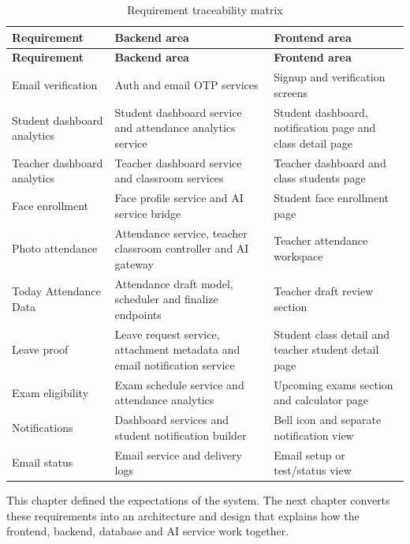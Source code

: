 \begin{longtable}{p{3.4cm} p{4.4cm} p{5.8cm}}
\caption{Requirement traceability matrix}
\label{tab:req-traceability}\\
\toprule
\textbf{Requirement} & \textbf{Backend area} & \textbf{Frontend area}\\
\midrule
\endfirsthead
\toprule
\textbf{Requirement} & \textbf{Backend area} & \textbf{Frontend area}\\
\midrule
\endhead
Email verification & Auth and email OTP services & Signup and verification screens\\
Student dashboard analytics & Student dashboard service and attendance analytics service & Student dashboard, notification page and class detail page\\
Teacher dashboard analytics & Teacher dashboard service and classroom services & Teacher dashboard and class students page\\
Face enrollment & Face profile service and AI service bridge & Student face enrollment page\\
Photo attendance & Attendance service, teacher classroom controller and AI gateway & Teacher attendance workspace\\
Today Attendance Data & Attendance draft model, scheduler and finalize endpoints & Teacher draft review section\\
Leave proof & Leave request service, attachment metadata and email notification service & Student class detail and teacher student detail page\\
Exam eligibility & Exam schedule service and attendance analytics & Upcoming exams section and calculator page\\
Notifications & Dashboard services and student notification builder & Bell icon and separate notification view\\
Email status & Email service and delivery logs & Email setup or test/status view\\
\bottomrule
\end{longtable}

This chapter defined the expectations of the system. The next chapter converts these requirements into an architecture and design that explains how the frontend, backend, database and AI service work together.
